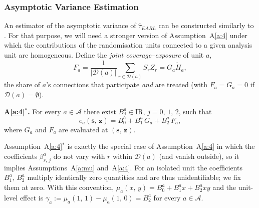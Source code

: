 \documentclass[sigconf,nonacm]{acmart}
\newcounter{assumption}
\newenvironment{assumptionstar}[1]{\par\medskip\noindent\textbf{#1.}\enspace}{\par\medskip}
\newcommand{\R}{\mathrm{I}\!\mathrm{R}}
\begin{document}
\subsubsection{Asymptotic Variance Estimation}\label{subsubsec:variance}
An estimator of the asymptotic variance of $\hat\tau^{\phantom{1}}_{EARL}$ can be constructed similarly to \cite[Section 5.1]{harshaw2023erl}. For that purpose, we will need a stronger version of Assumption~A\ref{a:4} under which the contributions of the randomisation units connected to a given analysis unit are homogeneous. Define the \emph{joint coverage--exposure} of unit $a$,
\begin{equation}\label{eq:Fa}
    F_a = \frac{1}{|\mathcal{D}(a)|}\sum_{r\in\mathcal{D}(a)} S_rZ_r = G_a\tilde H_a,
\end{equation}
the share of $a$'s connections that participate \emph{and} are treated (with $F_a=G_a=0$ if $\mathcal D(a)=\emptyset$).

\begin{assumptionstar}{A\ref{a:4}$^*$}
For every $a\in\mathcal A$ there exist $B^a_j\in\R$, $j=0,\,1,\,2$, such that
\begin{equation*}
    e_a(\mathbf s,\,\mathbf z) = B^a_0 + B^a_1 \, G_a + B^a_2 \, F_a ,
\end{equation*}
where $G_a$ and $F_a$ are evaluated at $(\mathbf s,\,\mathbf z)$.
\end{assumptionstar}

Assumption~A\ref{a:4}$^*$ is exactly the special case of Assumption~A\ref{a:4} in which the coefficients $\beta^a_{r,\,j}$ do not vary with $r$ within $\mathcal D(a)$ (and vanish outside), so it implies Assumptions~A\ref{a:mu} and~A\ref{a:4}. For an isolated unit the coefficients $B_1^a,\,B_2^a$ multiply identically zero quantities and are thus unidentifiable; we fix them at zero. With this convention, $\mu_a(x,\,y) = B_0^a + B_1^ax + B_2^axy$ and the unit-level effect is $\gamma_a := \mu_a(1,\,1)-\mu_a(1,\,0) = B_2^a$ for every $a\in\mathcal A$.
\end{document}
